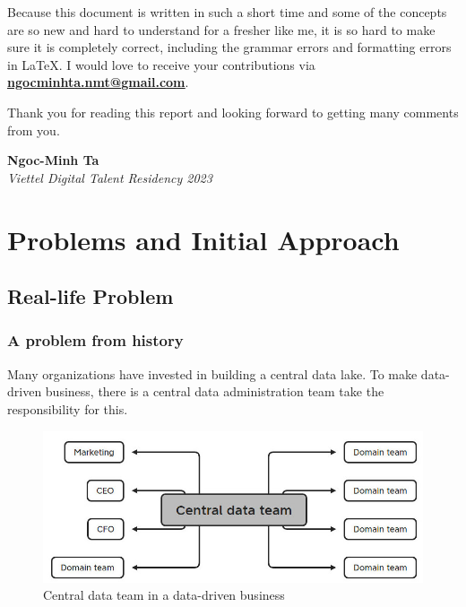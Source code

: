 \documentclass[12pt, a4paper]{book}
\begin{document}
Because this document is written in such a short time and some of the concepts are so new and hard to understand for a fresher like me, it is so hard to make sure it is completely correct, including the grammar errors and formatting errors in \LaTeX. I would love to receive your contributions via \underline{\textbf{\href{mailto:ngocminhta.nmt@gmail.com}{ngocminhta.nmt@gmail.com}}}.

Thank you for reading this report and looking forward to getting many comments from you.\\
\vspace{0.5cm}

\raggedleft
\textbf{Ngoc-Minh Ta}\\
\textit{Viettel Digital Talent Residency 2023}

\justifying
{}

        \tableofcontents
        \listoffigures
        \let\cleardoublepage\clearpage
        \listoftables
        \let\cleardoublepage\clearpage
    \endgroup
    
    \begingroup
        \frontmatter
        \justifying
        \let\cleardoublepage\clearpage
    \endgroup
    
    \mainmatter
    \justifying
    \normalsize
\chapter{Problems and Initial Approach}

\section{Real-life Problem}
\subsection{A problem from history}
Many organizations have invested in building a central data lake. To make data-driven business, there is a central data administration team take the responsibility for this.

\begin{figure}[h]
	\begin{framed}
		\centering
		\includegraphics[width=14cm]{CentralDataTeam.jpg}
		\caption{Central data team in a data-driven business}
		\label{centraldata}
	\end{framed}
\end{figure}
\end{document}
